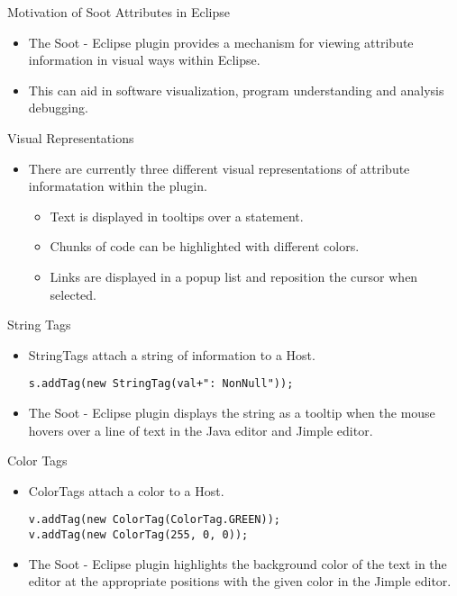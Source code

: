 \begin{slide}{Motivation of Soot Attributes in Eclipse}
\begin{itemize}
\item The Soot - Eclipse plugin provides a mechanism for viewing
attribute information in visual ways within Eclipse.
\item This can aid in software visualization, program understanding and analysis debugging.
\end{itemize}
\end{slide}

\begin{slide}{Visual Representations}
\begin{itemize}
\item There are currently three different visual representations of attribute informatation within the plugin.
\begin{itemize}
\item Text is displayed in tooltips over a statement.
\item Chunks of code can be highlighted with different colors.
\item Links are displayed in a popup list and reposition the cursor when selected.
\end{itemize}
\end{itemize}
\end{slide}

\begin{slide}{String Tags}
\begin{itemize}
\item {\red StringTag}s attach a string of information to a {\red Host}.
{\scriptsize
\begin{verbatim}
s.addTag(new StringTag(val+": NonNull"));
\end{verbatim}
}
\item The Soot - Eclipse plugin displays the string as a tooltip when the mouse hovers over a line of text in the Java editor and Jimple editor.
\end{itemize}
\end{slide}

\begin{slide}{Color Tags}
\begin{itemize}
\item {\red ColorTag}s attach a color to a {\red Host}.
{\scriptsize
\begin{verbatim}
v.addTag(new ColorTag(ColorTag.GREEN));
v.addTag(new ColorTag(255, 0, 0));
\end{verbatim}
}
\item The Soot - Eclipse plugin highlights the background color of the text in the editor at the appropriate positions with the given color in the Jimple editor.
\end{itemize}
\end{slide}

